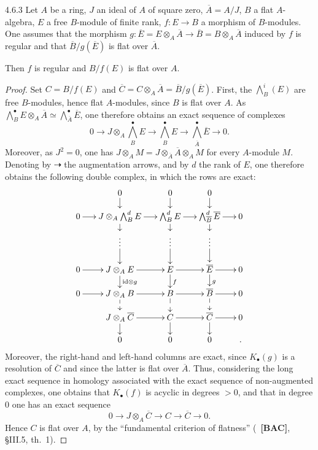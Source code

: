 \begin{lemma}{4.6.3}
\label{III.4.6.3}
{\renewcommand{\thefootnote}{(88)}}
Let \(A\) be a ring, \(J\) an ideal of \(A\) of square zero, \(\overline{A}=A/J\), \(B\) a flat \(A\)-algebra, \(E\) a free \(B\)-module of finite rank, \(f\colon E\to B\) a morphism of \(B\)-modules. One assumes that the morphism \(g\colon\overline{E}=E\otimes_{A}\overline{A}\to\overline{B}=B\otimes_{A}\overline{A}\) induced by \(f\) is regular and that \(\overline{B}/g(\overline{E})\) is flat over \(\overline{A}\).

Then \(f\) is regular and \(B/f(E)\) is flat over \(A\).
\end{lemma}

\begin{proof}
Set \(C=B/f(E)\) and \(\overline{C}=C\otimes_{A}\overline{A}=\overline{B}/g(\overline{E})\). First, the \(\bigwedge^{i}_{B}(E)\) are free \(B\)-modules, hence flat \(A\)-modules, since \(B\) is flat over \(A\). As \(\bigwedge^{\bullet}_{B}E\otimes_{A}\overline{A}\simeq\bigwedge^{\bullet}_{\overline{A}}\overline{E}\), one therefore obtains an exact sequence of complexes
\[
0\longrightarrow J\otimes_{A}\bigwedge^{\bullet}_{B}E\longrightarrow\bigwedge^{\bullet}_{B}E\longrightarrow\bigwedge^{\bullet}_{\overline{A}}\overline{E}\longrightarrow 0.
\]
Moreover, as \(J^{2}=0\), one has \(J\otimes_{A}M=J\otimes_{\overline{A}}\overline{A}\otimes_{A}M\) for every \(A\)-module \(M\). Denoting by \(\dashrightarrow\) the augmentation arrows, and by \(d\) the rank of \(E\), one therefore obtains the following double complex, in which the rows are exact:
\[
\xymatrix@C=1.5em@R=1.15em{
& 0 \ar[d] & 0 \ar[d] & 0 \ar[d] & \\
0 \ar[r]
& J\otimes_{A}\bigwedge^{d}_{B}E \ar[r] \ar[d]
& \bigwedge^{d}_{B}E \ar[r] \ar[d]
& \bigwedge^{d}_{\overline{B}}\overline{E} \ar[r] \ar[d]
& 0
\\
& \vdots \ar[d] & \vdots \ar[d] & \vdots \ar[d] & \\
0 \ar[r]
& J\otimes_{A}E \ar[r] \ar[d]^{\mathrm{id}\otimes g}
& E \ar[r] \ar[d]^{f}
& \overline{E} \ar[r] \ar[d]^{g}
& 0
\\
0 \ar[r]
& J\otimes_{A}B \ar[r] \ar@{-->}[d]
& B \ar[r] \ar@{-->}[d]
& \overline{B} \ar[r] \ar@{-->}[d]
& 0
\\
& J\otimes_{A}\overline{C} \ar[r] \ar[d]
& C \ar[r] \ar[d]
& \overline{C} \ar[r] \ar[d]
& 0
\\
& 0 & 0 & 0 & .
}
\]
Moreover, the right-hand and left-hand columns are exact, since \(K_{\bullet}(g)\) is a resolution of \(\overline{C}\) and since the latter is flat over \(\overline{A}\). Thus, considering the long exact sequence in homology associated with the exact sequence of non-augmented complexes, one obtains that \(K_{\bullet}(f)\) is acyclic in degrees \(>0\), and that in degree \(0\) one has an exact sequence
\[
0\longrightarrow J\otimes_{A}\overline{C}\longrightarrow C\longrightarrow\overline{C}\longrightarrow 0.
\]
Hence \(C\) is flat over \(A\), by the ``fundamental criterion of flatness'' (\cf~\textbf{[BAC]}, \S III.5, th.~1).
\end{proof}

